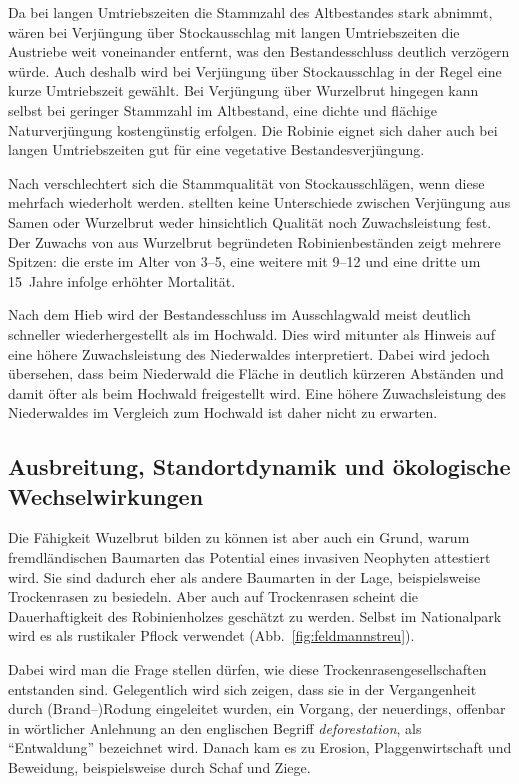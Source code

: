 \documentclass[twocolumn]{scrartcl}
\begin{document}
Da bei langen Umtriebszeiten die Stammzahl des Altbestandes stark
abnimmt, wären bei Verjüngung über Stockausschlag mit langen
Umtriebszeiten die Austriebe weit voneinander entfernt, was den
Bestandesschluss deutlich verzögern würde. Auch deshalb wird bei
Verjüngung über Stockausschlag in der Regel eine kurze Umtriebszeit
gewählt. Bei Verjüngung über Wurzelbrut hingegen kann selbst bei
geringer Stammzahl im Altbestand, eine dichte und flächige
Naturverjüngung kostengünstig erfolgen. Die Robinie eignet sich daher
auch bei langen Umtriebszeiten gut für eine vegetative
Bestandesverjüngung.

Nach \citet{iski2019robinie} verschlechtert sich die Stammqualität von
Stockausschlägen, wenn diese mehrfach wiederholt
werden. \citet{redei2011robinieWaldbau} stellten keine Unterschiede
zwischen Verjüngung aus Samen oder Wurzelbrut weder hinsichtlich
Qualität noch Zuwachsleistung fest. Der Zuwachs von aus Wurzelbrut
begründeten Robinienbeständen zeigt mehrere Spitzen: die erste im
Alter von 3–5, eine weitere mit 9–12 und eine dritte um 15~Jahre
infolge erhöhter Mortalität.

Nach dem Hieb wird der Bestandesschluss im Ausschlagwald meist
deutlich schneller wiederhergestellt als im Hochwald. Dies wird
mitunter als Hinweis auf eine höhere Zuwachsleistung des Niederwaldes
interpretiert. Dabei wird jedoch übersehen, dass beim Niederwald die
Fläche in deutlich kürzeren Abständen und damit öfter als beim
Hochwald freigestellt wird. Eine höhere Zuwachsleistung des
Niederwaldes im Vergleich zum Hochwald ist daher nicht zu erwarten.

\subsection{Ausbreitung, Standortdynamik und ökologische Wechselwirkungen}

Die Fähigkeit Wuzelbrut bilden zu können ist aber auch ein Grund,
warum fremdländischen Baumarten das Potential eines invasiven
Neophyten attestiert wird. Sie sind dadurch eher als andere Baumarten
in der Lage, beispielsweise Trockenrasen zu besiedeln. Aber auch auf
Trockenrasen scheint die Dauerhaftigkeit des Robinienholzes geschätzt
zu werden. Selbst im Nationalpark wird es als rustikaler Pflock
verwendet (Abb.~\ref{fig:feldmannstreu}).

Dabei wird man die Frage stellen dürfen, wie diese
Trockenrasengesellschaften entstanden sind. Gelegentlich wird sich
zeigen, dass sie in der Vergangenheit durch (Brand--)Rodung
eingeleitet wurden, ein Vorgang, der neuerdings, offenbar in
wörtlicher Anlehnung an den englischen Begriff \emph{deforestation},
als \enquote{Entwaldung} bezeichnet wird. Danach kam es zu Erosion,
Plaggenwirtschaft und Beweidung, beispielsweise durch Schaf und Ziege.
\end{document}
